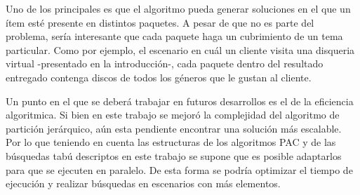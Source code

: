 Uno de los principales es que el algoritmo pueda generar soluciones en el que un ítem esté presente en distintos paquetes. A pesar de que no es parte del problema, sería interesante que cada paquete haga un cubrimiento de un tema particular. Como por ejemplo, el escenario en cuál un cliente visita una disqueria virtual -presentado en la introducción-, cada paquete dentro del resultado entregado contenga discos de todos los géneros que le gustan al cliente.

Un punto en el que se deberá trabajar en futuros desarrollos es el de la eficiencia algoritmica. Si bien en este trabajo se mejoró la complejidad del algoritmo de partición jerárquico, aún esta pendiente encontrar una solución más escalable. Por lo que teniendo en cuenta las estructuras de los algoritmos PAC y de las búsquedas tabú descriptos en este trabajo se supone que es posible adaptarlos para que se ejecuten en paralelo. De esta forma se podría optimizar el tiempo de ejecución y realizar búsquedas en escenarios con más elementos.